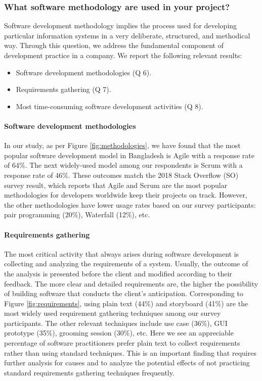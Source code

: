 \subsubsection{What software methodology are used in your project?}
\label{methodology}

Software development methodology implies the process used for developing particular information systems in a very deliberate, structured, and methodical way. Through this question, we address the fundamental component of development practice in a company. We report the following relevant results:

\begin{itemize}
\item Software development methodologies (Q 6).
\item Requirements gathering (Q 7).
\item Most time-consuming software development activities (Q 8).
\end{itemize}


\paragraph{Software development methodologies}
In our study, as per Figure \ref{fig:methodologies}, we have found that the most popular software development model in Bangladesh is Agile with a response rate of 64\%. The next widely-used model among our respondents is Scrum with a response rate of 46\%. These outcomes match the 2018 Stack Overflow (SO) survey \cite{StackoverflowSurvey2018} result, which reports that Agile and Scrum are the most popular methodologies for developers worldwide keep their projects on track. However, the other methodologies have lower usage rates based on our survey participants: pair programming (20\%), Waterfall (12\%), etc.


\paragraph{Requirements gathering}
The most critical activity that always arises during software development is collecting and analyzing the requirements of a system. Usually, the outcome of the analysis is presented before the client and modified according to their feedback. The more clear and detailed requirements are, the higher the possibility of building software that conducts the client’s anticipation. Corresponding to Figure \ref{fig:requirements}, using plain text (44\%) and storyboard (41\%) are the most widely used requirement gathering techniques among our survey participants. The other relevant techniques include use case (36\%), GUI prototype (35\%), grooming session (30\%), etc. Here we see an appreciable percentage of software practitioners prefer plain text to collect requirements rather than using standard techniques. This is an important finding that requires further analysis for causes and to analyze the potential effects of not practicing standard requirements gathering techniques frequently.  

